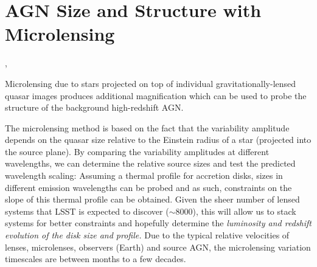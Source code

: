 %
%
%

\section{AGN Size and Structure with Microlensing}\label{sec:AGNMicrolensing}
\def\secname{\chpname:microlensing}\label{sec:\secname}

,

Microlensing due to stars projected on top of individual
gravitationally-lensed quasar images produces additional magnification which can be used to probe the structure of the background high-redshift AGN.


The microlensing method is based on the fact that the variability amplitude depends on the quasar size relative to the Einstein radius of a star (projected into the source plane). By comparing the variability amplitudes at different wavelengths, we can determine the relative source sizes and test the predicted wavelength scaling: Assuming a thermal profile for accretion disks, sizes in different emission
wavelengths can be probed and as such, constraints on the slope of this
thermal profile can be obtained. Given the sheer number of lensed systems that LSST is expected to discover ($\sim8000$), this will allow us to stack systems for better
constraints and hopefully determine the {\it luminosity and redshift evolution
of the disk size and profile.} Due to the typical relative velocities of lenses,
microlenses, observers (Earth) and source AGN, the microlensing variation
timescales are between months to a few decades.





